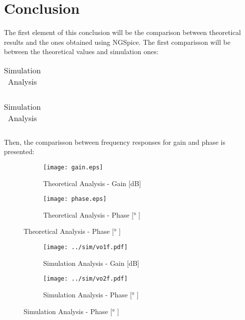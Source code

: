 \section{Conclusion}
\label{sec:conclusion}
\paragraph{}
\par The first element of this conclusion will be the comparison between theoretical results and the ones obtained using NGSpice. The first comparisson will be between the theoretical values and simulation ones:

\begin{table}[H]
	\begin{minipage}{.5\linewidth}
		\centering
		\begin{tabular}{|c|c|}
		\hline
		
		
		\end{tabular}
		\caption{Theoretical Analysis}
		\label{table1a}
	\end{minipage}
	\begin{minipage}{.5\linewidth}
		\centering
		\begin{tabular}{|c|c|}
		\hline
		
		
		
	\end{tabular}
		\caption{Simulation Analysis}
		\label{table1b}
	\end{minipage} 
\end{table}

\par Then, the comparisson between frequency responses for gain and phase is presented:

\begin{figure}[H]
\centering
\begin{subfigure}{.5\textwidth}
  \centering
  \texttt{[image: gain.eps]}
  \caption{Theoretical Analysis - Gain [dB]}
  \label{fig:sim4}
\end{subfigure}%
\begin{subfigure}{.5\textwidth}
  \centering
  \texttt{[image: phase.eps]}
  \caption{Theoretical Analysis - Phase [° ]}
  \label{fig:sim5}
\end{subfigure}
\end{figure}

\begin{figure}[H]
\centering
\begin{subfigure}{.5\textwidth}
  \centering
  \texttt{[image: ../sim/vo1f.pdf]}
  \caption{Simulation Analysis - Gain [dB]}
  \label{fig:sim4}
\end{subfigure}%
\begin{subfigure}{.5\textwidth}
  \centering
  \texttt{[image: ../sim/vo2f.pdf]}
  \caption{Simulation Analysis - Phase [° ]}
  \label{fig:sim5}
\end{subfigure}
\end{figure}

